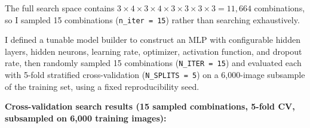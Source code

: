 \documentclass[11pt]{article}
\begin{document}
The full search space contains $3\times4\times3\times4\times3\times3\times3\times3 = 11{,}664$
combinations, so I sampled 15 combinations (\texttt{n\_iter = 15}) rather than searching
exhaustively.



I defined a tunable model builder to construct an MLP with configurable hidden layers, hidden
neurons, learning rate, optimizer, activation function, and dropout rate, then randomly sampled 15
combinations (\texttt{N\_ITER = 15}) and evaluated each with 5-fold stratified cross-validation
(\texttt{N\_SPLITS = 5}) on a 6,000-image subsample of the training set, using a fixed
reproducibility seed.

\textbf{Cross-validation search results (15 sampled combinations, 5-fold CV, subsampled on 6,000
training images):}
\end{document}
